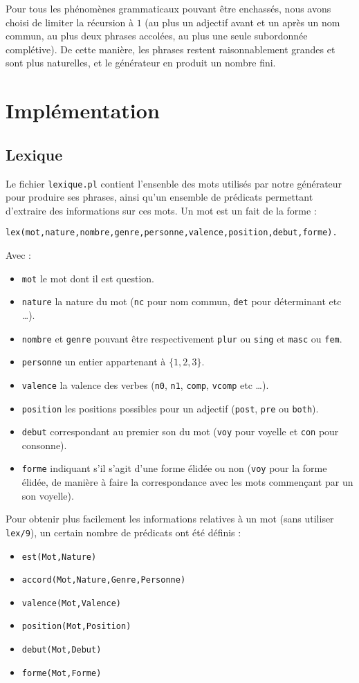 \documentclass[a4paper,10pt]{article}
\begin{document}
Pour tous les phénomènes grammaticaux pouvant être enchassés, nous avons choisi de limiter la récursion à $1$ (au plus un adjectif avant et un après un nom commun, au plus deux phrases accolées, au plus une seule subordonnée complétive). De cette manière, les phrases restent raisonnablement grandes et sont plus naturelles, et le générateur en produit un nombre fini.

\section{Implémentation}
\subsection{Lexique}
Le fichier \texttt{lexique.pl} contient l'ensenble des mots utilisés par notre générateur pour produire ses phrases, ainsi qu'un ensemble de prédicats permettant d'extraire des informations sur ces mots. Un mot est un fait de la forme :
\begin{verbatim}
lex(mot,nature,nombre,genre,personne,valence,position,debut,forme).
\end{verbatim}
Avec :
\begin{itemize}
\item \texttt{mot} le mot dont il est question.
\item \texttt{nature} la nature du mot (\texttt{nc} pour nom commun, \texttt{det} pour déterminant etc \dots).
\item \texttt{nombre} et \texttt{genre} pouvant être respectivement \texttt{plur} ou \texttt{sing} et \texttt{masc} ou \texttt{fem}.
\item \texttt{personne} un entier appartenant à $ \{1,2,3\} $.
\item \texttt{valence} la valence des verbes (\texttt{n0}, \texttt{n1}, \texttt{comp}, \texttt{vcomp} etc \dots).
\item \texttt{position} les positions possibles pour un adjectif (\texttt{post}, \texttt{pre} ou \texttt{both}).
\item \texttt{debut} correspondant au premier son du mot (\texttt{voy} pour voyelle et \texttt{con} pour consonne).
\item \texttt{forme} indiquant s'il s'agit d'une forme élidée ou non (\texttt{voy} pour la forme élidée, de manière à faire la correspondance avec les mots commençant par un son voyelle).
\end{itemize}

Pour obtenir plus facilement les informations relatives à un mot (sans utiliser \texttt{lex/9}), un certain nombre de prédicats ont été définis :
\begin{itemize}
\item \texttt{est(Mot,Nature)}
\item \texttt{accord(Mot,Nature,Genre,Personne)}
\item \texttt{valence(Mot,Valence)}
\item \texttt{position(Mot,Position)}
\item \texttt{debut(Mot,Debut)}
\item \texttt{forme(Mot,Forme)}
\end{itemize}
\end{document}
